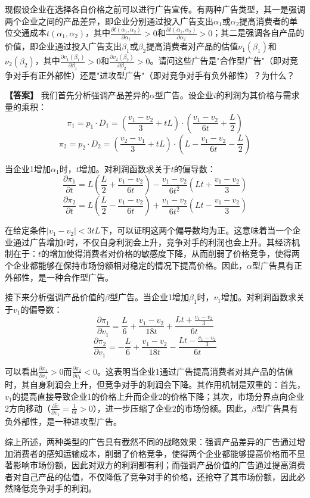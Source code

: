 \documentclass[12pt]{article}
\begin{document}
现假设企业在选择各自价格之前可以进行广告宣传。有两种广告类型，其一是强调两个企业之间的产品差异，即企业分别通过投入广告支出$\alpha_1$或$\alpha_2$提高消费者的单位交通成本$t(\alpha_1,\alpha_2)$，其中$\frac{\partial t(\alpha_1,\alpha_2)}{\partial\alpha_1}>0$和$\frac{\partial t(\alpha_1,\alpha_2)}{\partial\alpha_2}>0$；其二是强调各自产品的价值，即企业通过投入广告支出$\beta_1$或$\beta_2$提高消费者对产品的估值$\nu_1(\beta_1)$和$\nu_2(\beta_2)$，其中$\frac{\partial v_1(\beta_1)}{\partial\beta_1}>0$和$\frac{\partial v_2(\beta_2)}{\partial\beta_2}>0$。请问这些广告是"合作型广告"（即对竞争对手有正外部性）还是"进攻型广告"（即对竞争对手有负外部性）？为什么？

\noindent\textbf{【答案】}
我们首先分析强调产品差异的$\alpha$型广告。设企业$i$的利润为其价格与需求量的乘积：
\[\pi_1 = p_1 \cdot D_1 = (\frac{v_1-v_2}{3}+tL) \cdot (\frac{v_1-v_2}{6t}+\frac{L}{2})\]
\[\pi_2 = p_2 \cdot D_2 = (\frac{v_2-v_1}{3}+tL) \cdot (L-\frac{v_1-v_2}{6t}-\frac{L}{2})\]

当企业1增加$\alpha_1$时，$t$增加。对利润函数求关于$t$的偏导数：
\[\frac{\partial \pi_1}{\partial t} = L(\frac{L}{2}+\frac{v_1-v_2}{6t})-\frac{v_1-v_2}{6t^2}(Lt+\frac{v_1-v_2}{3})\]
\[\frac{\partial \pi_2}{\partial t} = L(\frac{L}{2}-\frac{v_1-v_2}{6t})+\frac{v_1-v_2}{6t^2}(Lt-\frac{v_1-v_2}{3})\]

在给定条件$|v_1-v_2|<3tL$下，可以证明这两个偏导数均为正。这意味着当一个企业通过广告增加$t$时，不仅自身利润会上升，竞争对手的利润也会上升。其经济机制在于：$t$的增加使得消费者对价格的敏感度下降，从而削弱了价格竞争，使得两个企业都能够在保持市场份额相对稳定的情况下提高价格。因此，$\alpha$型广告具有正外部性，是一种合作型广告。

接下来分析强调产品价值的$\beta$型广告。当企业1增加$\beta_1$时，$v_1$增加。对利润函数求关于$v_1$的偏导数：
\[\frac{\partial \pi_1}{\partial v_1} = \frac{L}{6}+\frac{v_1-v_2}{18t}+\frac{Lt+\frac{v_1-v_2}{3}}{6t}\]
\[\frac{\partial \pi_2}{\partial v_1} = -\frac{L}{6}+\frac{v_1-v_2}{18t}-\frac{Lt-\frac{v_1-v_2}{3}}{6t}\]

可以看出$\frac{\partial \pi_1}{\partial v_1}>0$而$\frac{\partial \pi_2}{\partial v_1}<0$。这表明当企业1通过广告提高消费者对其产品的估值时，其自身利润会上升，但竞争对手的利润会下降。其作用机制是双重的：首先，$v_1$的提高直接导致企业1的价格上升而企业2的价格下降；其次，市场分界点向企业2方向移动（$\frac{\partial \tilde{x}}{\partial v_1}=\frac{1}{6t}>0$），进一步压缩了企业2的市场份额。因此，$\beta$型广告具有负外部性，是一种进攻型广告。

综上所述，两种类型的广告具有截然不同的战略效果：强调产品差异的广告通过增加消费者的感知运输成本，削弱了价格竞争，使得两个企业都能够提高价格而不显著影响市场份额，因此对双方的利润都有利；而强调产品价值的广告通过提高消费者对自己产品的估值，不仅降低了竞争对手的价格，还抢夺了其市场份额，因此必然降低竞争对手的利润。
\end{document}
